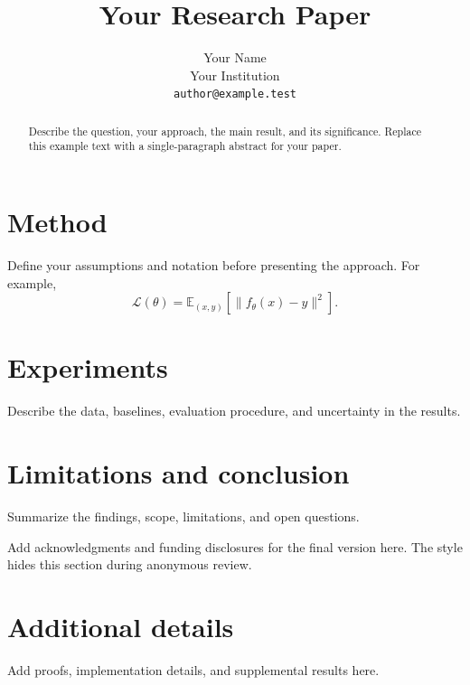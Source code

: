\documentclass{article}
\title{Your Research Paper}
\author{Your Name \\ Your Institution \\ \texttt{author@example.test}}
\begin{document}
\maketitle

\begin{abstract}
Describe the question, your approach, the main result, and its significance.
Replace this example text with a single-paragraph abstract for your paper.
\end{abstract}



\section{Method}
Define your assumptions and notation before presenting the approach. For example,
\begin{equation}
  \mathcal{L}(\theta) = \mathbb{E}_{(x,y)}\left[\|f_\theta(x)-y\|^2\right].
\end{equation}

\section{Experiments}
Describe the data, baselines, evaluation procedure, and uncertainty in the results.

\section{Limitations and conclusion}
Summarize the findings, scope, limitations, and open questions.

\begin{ack}
Add acknowledgments and funding disclosures for the final version here.
The style hides this section during anonymous review.
\end{ack}




\appendix
\section{Additional details}
Add proofs, implementation details, and supplemental results here.


\end{document}
